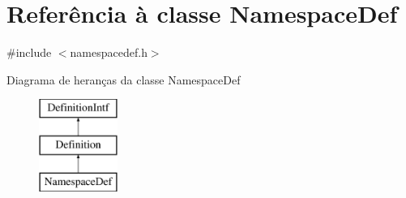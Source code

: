 \hypertarget{class_namespace_def}{\section{Referência à classe Namespace\-Def}
\label{class_namespace_def}
}


{\ttfamily \#include $<$namespacedef.\-h$>$}

Diagrama de heranças da classe Namespace\-Def\begin{figure}[H]
\begin{center}
\leavevmode
\includegraphics[height=3.000000cm]{class_namespace_def}
\end{center}
\end{figure}
